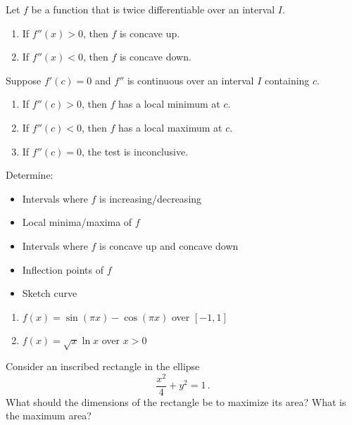 \documentclass[12pt]{amsart}
\begin{document}
\begin{theorem}
	Let $f$ be a function that is twice differentiable over an interval $I$.
	\begin{enumerate}
		\item If $f''(x) > 0$, then $f$ is concave up.
		\item If $f''(x) < 0$, then $f$ is concave down.
	\end{enumerate}
\end{theorem}


\begin{theorem}
	Suppose $f'(c) = 0$ and $f''$ is continuous over an interval $I$ containing $c$.
	\begin{enumerate}
		\item If $f''(c)>0$, then $f$ has a local minimum at $c$.
		\item If $f''(c)<0$, then $f$ has a local maximum at $c$.
		\item If $f''(c)=0$, the test is inconclusive.
	\end{enumerate}
\end{theorem}

\begin{question}
	Determine:
	\begin{itemize}
		\item Intervals where $f$ is increasing/decreasing
		\item Local minima/maxima of $f$
		\item Intervals where $f$ is concave up and concave down
		\item Inflection points of $f$
		\item Sketch curve
	\end{itemize}

	\begin{enumerate}
		\item $f(x) = \sin (\pi x) - \cos(\pi x)$ over $[-1,1]$
		      \vspace{5cm}
		\item $f(x) = \sqrt x \ln x$ over $x>0$
		      \vspace{5cm}
	\end{enumerate}
\end{question}

\begin{question}
	Consider an inscribed rectangle in the ellipse
	$$\frac{x^2}{4} + y^2 = 1 \,.$$
	What should the dimensions of the rectangle be to maximize its area?
	What is the maximum area?
\end{question}
\end{document}
